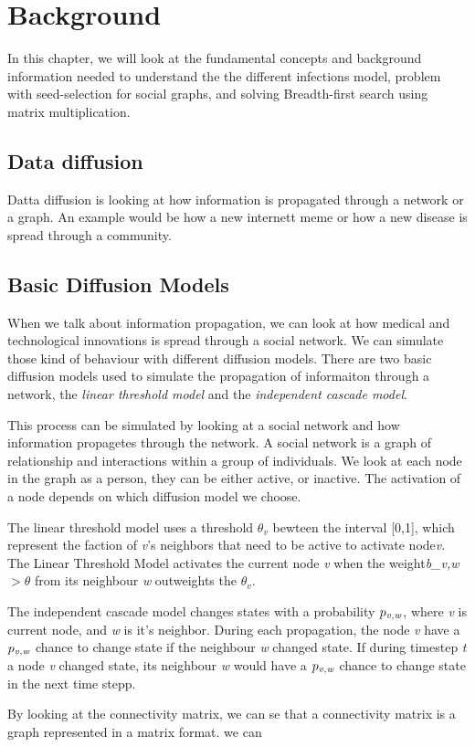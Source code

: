 \chapter{Background} 

In this chapter, we will look at the fundamental concepts and background information needed to understand the the different infections model, problem with seed-selection for social graphs, and solving Breadth-first search using matrix multiplication.

\section{Data diffusion}
Datta diffusion is looking at how information is propagated through a network or a graph. An example would be how a new internett meme or how a new disease is spread through a community. 

\section{Basic Diffusion Models}
When we talk about information propagation, we can look at how medical and technological innovations is spread through a social network. We can simulate those kind of behaviour with different diffusion models. There are two basic diffusion models used to simulate the propagation of informaiton through a network\cite{kempe}, the {\it linear threshold model} and the {\it independent cascade model}\cite{kempe}.

This process can be simulated by looking at a social network and how information propagetes through the network. A social network is a graph of relationship and interactions within a group of individuals. 
We look at each node in the graph as a person, they can be either active, or inactive. The activation of a node depends on which diffusion model we choose.

The linear threshold model uses a threshold $\theta_v$ bewteen the interval [0,1], which represent the faction of {\it v}'s neighbors that need to be active to activate node{\it v}. The Linear Threshold Model activates the current node {\it v} when the weight{\it b_{v,w}} $> \theta$ from its neighbour {\it w} outweights the $\theta_v$. 

The independent cascade model changes states with a probability $p_{\it v, w}$, where {\it v }is current node, and {\it w} is it's neighbor. During each propagation, the node {\it v} have a  $p_{\it v, w}$ chance to change state if the neighbour {\it w} changed state. If during timestep {\it t} a node {\it v} changed state, its neighbour {\it w} would have a  $p_{\it v, w}$ chance to change state in the next time stepp. 

By looking at the 	connectivity matrix, we can se that a connectivity matrix is a graph represented in a matrix format. we can